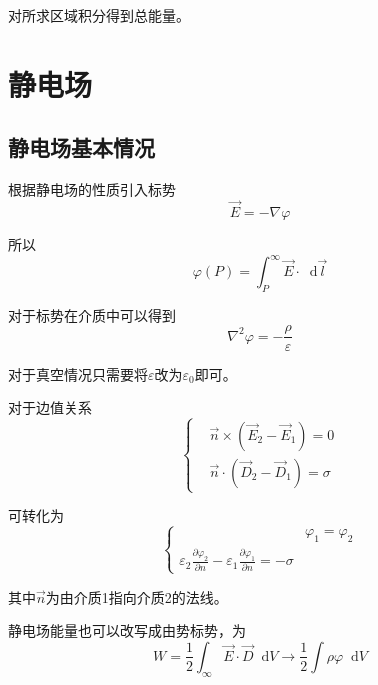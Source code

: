 \documentclass[UTF8]{ctexart}
\newcommand*{\dif}{\mathop{}\!\mathrm{d}}
\begin{document}
\noindent 对所求区域积分得到总能量。

    \section{静电场}
    \subsection{静电场基本情况}
    根据静电场的性质引入标势
    \begin{equation}
        \vec{E} = - \nabla \varphi
    \end{equation}

\noindent 所以 
\begin{equation}
    \varphi(P) = \int_{P}^{\infty} \vec{E} \cdot \dif \vec{l}
\end{equation}

    对于标势在介质中可以得到
    \begin{equation}
        \nabla^2 \varphi = - \frac{\rho}{\varepsilon}
    \end{equation}

\noindent 对于真空情况只需要将$\varepsilon$改为$\varepsilon_0$即可。

    对于边值关系
    \begin{equation}
        \left \{ \begin{aligned}
            &\vec{n} \times (\vec{E}_2 - \vec{E}_1) = 0 \\ 
            &\vec{n} \cdot (\vec{D}_2 - \vec{D}_1) = \sigma 
        \end{aligned} \right.
    \end{equation}

\noindent 可转化为
\begin{equation}
    \left \{ \begin{aligned}
        &\varphi_1 = \varphi_2 \\
        \varepsilon_2 \frac{\partial \varphi_2}{\partial n} - \varepsilon_1 \frac{\partial \varphi_1}{\partial n} = - \sigma 
    \end{aligned} \right.
\end{equation}

\noindent 其中$\vec{n}$为由介质1指向介质2的法线。

    静电场能量也可以改写成由势标势，为
    \begin{equation}
        W = \frac{1}{2} \int_{\infty} \vec{E} \cdot \vec{D} \dif V \rightarrow \frac{1}{2} \int \rho \varphi \dif V
    \end{equation}
\end{document}
